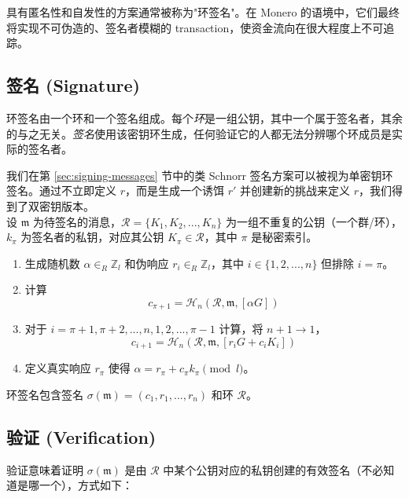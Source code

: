 具有匿名性和自发性的方案通常被称为"环签名"。在 Monero 的语境中，它们最终将实现不可伪造的、签名者模糊的 transaction，使资金流向在很大程度上不可追踪。


\subsection*{签名 (Signature)}

环签名由一个环和一个签名组成。每个{\em 环}是一组公钥，其中一个属于签名者，其余的与之无关。{\em 签名}使用该密钥环生成，任何验证它的人都无法分辨哪个环成员是实际的签名者。

我们在第 \ref{sec:signing-messages} 节中的类 Schnorr 签名方案可以被视为单密钥环签名。通过不立即定义 $r$，而是生成一个诱饵 $r'$ 并创建新的挑战来定义 $r$，我们得到了双密钥版本。
\\

设 \(\mathfrak{m}\) 为待签名的消息，\(\mathcal{R} = \{K_1, K_2, ..., K_n\}\) 为一组不重复的公钥（一个群/环），\(k_\pi\) 为签名者的私钥，对应其公钥 \(K_\pi \in \mathcal{R}\)，其中 $\pi$ 是秘密索引。

\begin{enumerate}
	\item 生成随机数 \(\alpha \in_R \mathbb{Z}_l\) 和伪响应 \(r_i \in_R \mathbb{Z}_l\)，其中 \(i \in \{1, 2, ..., n\}\) 但排除 \(i = \pi\)。

	\item 计算
	\[c_{\pi+1} = \mathcal{H}_n(\mathcal{R}, \mathfrak{m}, [\alpha G])\]

	\item 对于 \(i = \pi+1, \pi+2, ..., n, 1, 2, ..., \pi-1\) 计算，将 \(n + 1 \rightarrow 1\)，\vspace{.175cm}
	\[  c_{i+1} = \mathcal{H}_n(\mathcal{R}, \mathfrak{m}, [r_i G + c_i K_i])\] 

	\item 定义真实响应 $r_\pi$ 使得 \(\alpha = r_\pi + c_\pi k_\pi \pmod l\)。
\end{enumerate}

环签名包含签名 \(\sigma(\mathfrak{m}) = (c_1, r_1, ..., r_n) \) 和环 $\mathcal{R}$。


\subsection*{验证 (Verification)}

验证意味着证明 $\sigma(\mathfrak{m})$ 是由 $\mathcal{R}$ 中某个公钥对应的私钥创建的有效签名（不必知道是哪一个），方式如下：

